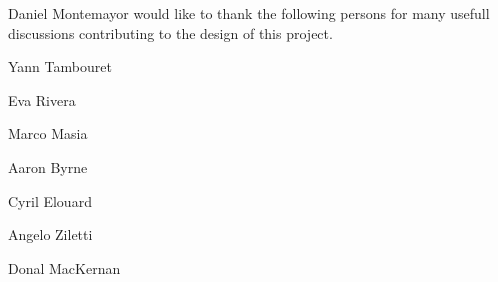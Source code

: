 Daniel Montemayor would like to thank the following persons for many usefull discussions contributing to the design of this project.


\begin{DoxyItemize}
\item Yann Tambouret
\item Eva Rivera
\item Marco Masia
\item Aaron Byrne
\item Cyril Elouard
\item Angelo Ziletti
\item Donal Mac\-Kernan 
\end{DoxyItemize}
